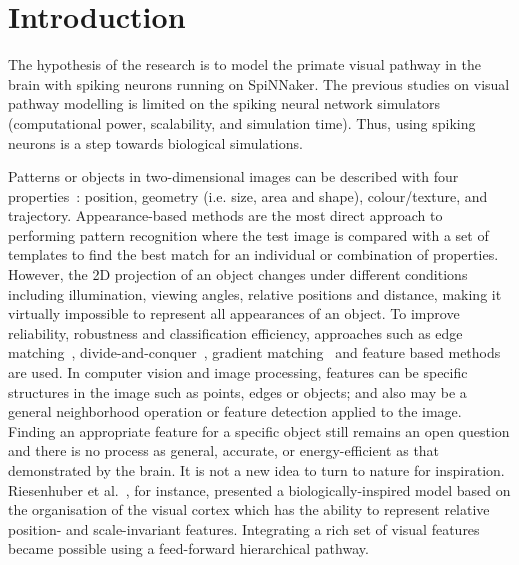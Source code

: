 \chapter{Introduction}
\label{cha:intro}
The hypothesis of the research is to model the primate visual pathway in the brain with spiking neurons running on SpiNNaker.
The previous studies on visual pathway modelling is limited on the spiking neural network simulators (computational power, scalability, and simulation time).
Thus, using spiking neurons is a step towards biological simulations.

Patterns or objects in two-dimensional images can be described with four properties~\cite{wysoski2008fast}: position, geometry (i.e. size, area and shape), colour/texture, and trajectory. 
Appearance-based methods are the most direct approach to performing pattern recognition where the test image is compared with a set of templates to find the best match for an individual or combination of properties. 
However, the 2D projection of an object changes under different conditions including illumination, viewing angles, relative positions and distance, making it virtually impossible to represent all appearances of an object. 
To improve reliability, robustness and classification efficiency, approaches such as edge matching~\cite{canny1986computational}, divide-and-conquer~\cite{toygar2004multiple}, gradient matching~\cite{wei2006robust} and feature based methods~\cite{lowe2004distinctive, bay2008speeded} are used.
In computer vision and image processing, features can be specific structures in the image such as points, edges or objects; and also may be a general neighborhood operation or feature detection applied to the image.
Finding an appropriate feature for a specific object still remains an open question and there is no process as general, accurate, or energy-efficient as that demonstrated by the brain.
It is not a new idea to turn to nature for inspiration. 
Riesenhuber et al.~\cite{riesenhuber1999hierarchical}, for instance, presented a biologically-inspired model based on the organisation of the visual cortex which has the ability to represent relative position- and scale-invariant features.
Integrating a rich set of visual features became possible using a feed-forward hierarchical pathway. 

